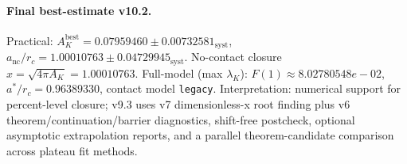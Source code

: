 \paragraph{Final best-estimate v10.2.}
Practical: $A_K^{\mathrm{best}} = 0.07959460 \pm 0.00732581_{\mathrm{syst}}$, $a_{\mathrm{nc}}/r_c = 1.00010763 \pm 0.04729945_{\mathrm{syst}}$.
No-contact closure $x = \sqrt{4\pi A_K} = 1.00010763$.
Full-model (max $\lambda_K$): $F(1) \approx 8.02780548e-02$, $a^*/r_c = 0.96389330$, contact model \texttt{legacy}.
Interpretation: numerical support for percent-level closure; v9.3 uses v7 dimensionless-x root finding plus v6 theorem/continuation/barrier diagnostics, shift-free postcheck, optional asymptotic extrapolation reports, and a parallel theorem-candidate comparison across plateau fit methods.
